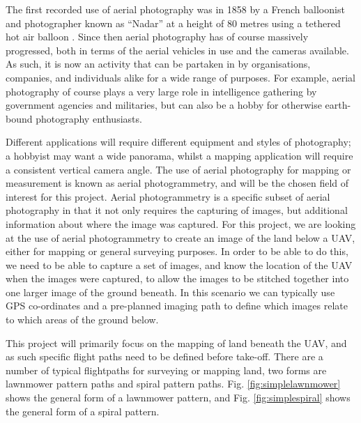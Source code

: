 The first recorded use of aerial photography was in 1858 by a French balloonist and photographer known as ``Nadar'' at a height of 80 metres using a tethered hot air balloon \cite{Nadar}. Since then aerial photography has of course massively progressed, both in terms of the aerial vehicles in use and the cameras available. As such, it is now an activity that can be partaken in by organisations, companies, and individuals alike for a wide range of purposes. For example, aerial photography of course plays a very large role in intelligence gathering by government agencies and militaries, but can also be a hobby for otherwise earth-bound photography enthusiasts. 

Different applications will require different equipment and styles of photography; a hobbyist may want a wide panorama, whilst a mapping application will require a consistent vertical camera angle. The use of aerial photography for mapping or measurement is known as aerial photogrammetry, and will be the chosen field of interest for this project. Aerial photogrammetry is a specific subset of aerial photography in that it not only requires the capturing of images, but additional information about where the image was captured. For this project, we are looking at the use of aerial photogrammetry to create an image of the land below a UAV, either for mapping or general surveying purposes. In order to be able to do this, we need to be able to capture a set of images, and know the location of the UAV when the images were captured, to allow the images to be stitched together into one larger image of the ground beneath. In this scenario we can typically use GPS co-ordinates and a pre-planned imaging path to define which images relate to which areas of the ground below.


This project will primarily focus on the mapping of land beneath the UAV, and as such specific flight paths need to be defined before take-off. There are a number of typical flightpaths for surveying or mapping land, two forms are lawnmower pattern paths and spiral pattern paths. Fig. \ref{fig:simplelawnmower} shows the general form of a lawnmower pattern, and Fig. \ref{fig:simplespiral} shows the general form of a spiral pattern.

